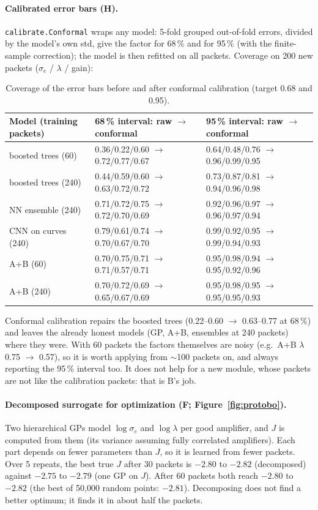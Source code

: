 \documentclass[10pt]{article}
\newcommand{\code}[1]{\texttt{#1}}
\begin{document}
\paragraph{Calibrated error bars (H).} \code{calibrate.Conformal} wraps any model: 5-fold grouped out-of-fold errors, divided by the
model's own std, give the factor for 68\,\% and for 95\,\% (with the finite-sample correction); the model is then refitted on all packets.
Coverage on 200 new packets ($\sigma_e$ / $\lambda$ / gain):
\begin{table}[h]
\centering\small
\begin{tabular}{lll}
\toprule
Model (training packets) & 68\,\% interval: raw $\to$ conformal & 95\,\% interval: raw $\to$ conformal \\
\midrule
boosted trees (60) & 0.36/0.22/0.60 $\to$ 0.72/0.77/0.67 & 0.64/0.48/0.76 $\to$ 0.96/0.99/0.95 \\
boosted trees (240) & 0.44/0.59/0.60 $\to$ 0.63/0.72/0.72 & 0.73/0.87/0.81 $\to$ 0.94/0.96/0.98 \\
NN ensemble (240) & 0.71/0.72/0.75 $\to$ 0.72/0.70/0.69 & 0.92/0.96/0.97 $\to$ 0.96/0.97/0.94 \\
CNN on curves (240) & 0.79/0.61/0.74 $\to$ 0.70/0.67/0.70 & 0.99/0.92/0.95 $\to$ 0.99/0.94/0.93 \\
A+B (60) & 0.70/0.75/0.71 $\to$ 0.71/0.57/0.71 & 0.95/0.98/0.94 $\to$ 0.95/0.92/0.96 \\
A+B (240) & 0.70/0.72/0.69 $\to$ 0.65/0.67/0.69 & 0.95/0.98/0.95 $\to$ 0.95/0.95/0.93 \\
\bottomrule
\end{tabular}
\caption{Coverage of the error bars before and after conformal calibration (target 0.68 and 0.95).}
\label{tab:conformal}
\end{table}
Conformal calibration repairs the boosted trees (0.22--0.60 $\to$ 0.63--0.77 at 68\,\%) and leaves the already honest models (GP, A+B,
ensembles at 240 packets) where they were. With 60 packets the factors themselves are noisy (e.g.\ A+B $\lambda$ 0.75 $\to$ 0.57), so it is
worth applying from $\sim$100 packets on, and always reporting the 95\,\% interval too. It does not help for a new module, whose packets
are not like the calibration packets: that is B's job.

\paragraph{Decomposed surrogate for optimization (F; Figure~\ref{fig:protobo}).} Two hierarchical GPs model $\log\sigma_e$ and $\log\lambda$
per good amplifier, and $J$ is computed from them (its variance assuming fully correlated amplifiers). Each part depends on fewer
parameters than $J$, so it is learned from fewer packets. Over 5 repeats, the best true $J$ after 30 packets is $-2.80$ to $-2.82$
(decomposed) against $-2.75$ to $-2.79$ (one GP on $J$). After 60 packets both reach $-2.80$ to $-2.82$ (the best of 50{,}000 random
points: $-2.81$). Decomposing does not find a better optimum; it finds it in about half the packets.
\end{document}
